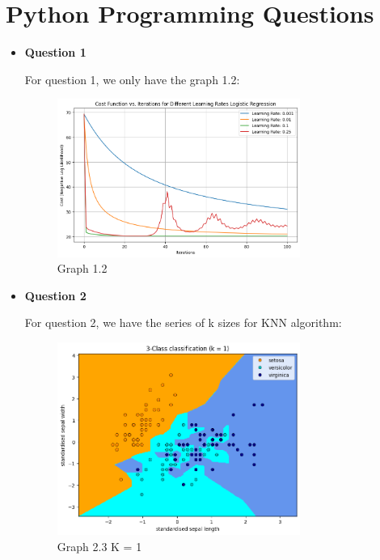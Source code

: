 \documentclass[12pt]{article}
\begin{document}
\section{Python Programming Questions}


\begin{itemize} 
  \item \textbf{Question 1}
  
  For question 1, we only have the graph 1.2: 

  \begin{figure}[H]
    \centering
    \includegraphics[width=0.75\textwidth]{1_2.png}
    \caption{Graph 1.2}
    \label{fig:graph1.2}
  \end{figure}




  \item \textbf{Question 2}
  
  For question 2, we have the series of k sizes for KNN algorithm: 

  \begin{figure}[H]
    \centering
    \includegraphics[width=0.75\textwidth]{2_3_k1.png}
    \caption{Graph 2.3 K = 1}
    \label{fig:graph2.3_k1}
  \end{figure}


\end{itemize}
\end{document}
